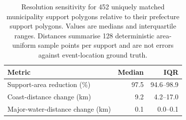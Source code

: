 \begin{table}[t]
\centering
\small
\setlength{\tabcolsep}{3pt}
\begin{tabular}{p{}rr}
\toprule
Metric & Median & IQR \\
\midrule
Support-area reduction (\%) & 97.5 & 94.6--98.9 \\
Coast-distance change (km) & 9.2 & 4.2--17.0 \\
Major-water-distance change (km) & 0.1 & 0.0--0.1 \\
\bottomrule
\end{tabular}
\caption{Resolution sensitivity for 452 uniquely matched municipality support polygons relative to their prefecture support polygons. Values are medians and interquartile ranges. Distances summarise 128 deterministic area-uniform sample points per support and are not errors against event-location ground truth.}
\label{tab:resolution}
\end{table}
